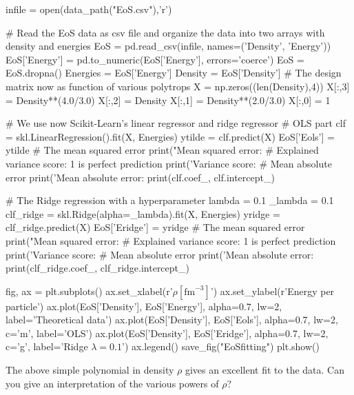 \documentclass[%
oneside,                 %
final,                   %
10pt]{article}
\begin{document}
infile = open(data_path("EoS.csv"),'r')

# Read the EoS data as  csv file and organize the data into two arrays with density and energies
EoS = pd.read_csv(infile, names=('Density', 'Energy'))
EoS['Energy'] = pd.to_numeric(EoS['Energy'], errors='coerce')
EoS = EoS.dropna()
Energies = EoS['Energy']
Density = EoS['Density']
#  The design matrix now as function of various polytrops
X = np.zeros((len(Density),4))
X[:,3] = Density**(4.0/3.0)
X[:,2] = Density
X[:,1] = Density**(2.0/3.0)
X[:,0] = 1

# We use now Scikit-Learn's linear regressor and ridge regressor
# OLS part
clf = skl.LinearRegression().fit(X, Energies)
ytilde = clf.predict(X)
EoS['Eols']  = ytilde
# The mean squared error                               
print("Mean squared error: %
# Explained variance score: 1 is perfect prediction                                 
print('Variance score: %
# Mean absolute error                                                           
print('Mean absolute error: %
print(clf.coef_, clf.intercept_)

# The Ridge regression with a hyperparameter lambda = 0.1
_lambda = 0.1
clf_ridge = skl.Ridge(alpha=_lambda).fit(X, Energies)
yridge = clf_ridge.predict(X)
EoS['Eridge']  = yridge
# The mean squared error                               
print("Mean squared error: %
# Explained variance score: 1 is perfect prediction                                 
print('Variance score: %
# Mean absolute error                                                           
print('Mean absolute error: %
print(clf_ridge.coef_, clf_ridge.intercept_)

fig, ax = plt.subplots()
ax.set_xlabel(r'$\rho[\mathrm{fm}^{-3}]$')
ax.set_ylabel(r'Energy per particle')
ax.plot(EoS['Density'], EoS['Energy'], alpha=0.7, lw=2,
            label='Theoretical data')
ax.plot(EoS['Density'], EoS['Eols'], alpha=0.7, lw=2, c='m',
            label='OLS')
ax.plot(EoS['Density'], EoS['Eridge'], alpha=0.7, lw=2, c='g',
            label='Ridge $\lambda = 0.1$')
ax.legend()
save_fig("EoSfitting")
plt.show()
\epycod

The above simple polynomial in density $\rho$ gives an excellent fit
to the data. Can you give an interpretation of the various powers of $\rho$?
\end{document}
